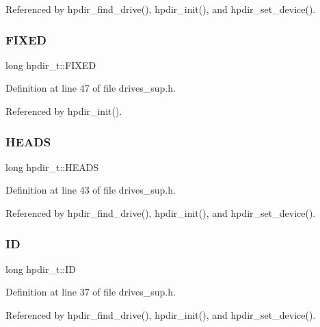 Referenced by hpdir\+\_\+find\+\_\+drive(), hpdir\+\_\+init(), and hpdir\+\_\+set\+\_\+device().

\mbox{\label{structhpdir__t_a69855da74bcc15b10039a51e3680a994}} 
\subsubsection{\texorpdfstring{F\+I\+X\+ED}{FIXED}}
{\footnotesize\ttfamily long hpdir\+\_\+t\+::\+F\+I\+X\+ED}



Definition at line 47 of file drives\+\_\+sup.\+h.



Referenced by hpdir\+\_\+init().

\mbox{\label{structhpdir__t_a0b636f508776a07e2aaba4704dc124f2}} 
\subsubsection{\texorpdfstring{H\+E\+A\+DS}{HEADS}}
{\footnotesize\ttfamily long hpdir\+\_\+t\+::\+H\+E\+A\+DS}



Definition at line 43 of file drives\+\_\+sup.\+h.



Referenced by hpdir\+\_\+find\+\_\+drive(), hpdir\+\_\+init(), and hpdir\+\_\+set\+\_\+device().

\mbox{\label{structhpdir__t_aae1a879f64c0ee2dc353d3581e8deec9}} 
\subsubsection{\texorpdfstring{ID}{ID}}
{\footnotesize\ttfamily long hpdir\+\_\+t\+::\+ID}



Definition at line 37 of file drives\+\_\+sup.\+h.



Referenced by hpdir\+\_\+find\+\_\+drive(), hpdir\+\_\+init(), and hpdir\+\_\+set\+\_\+device().

